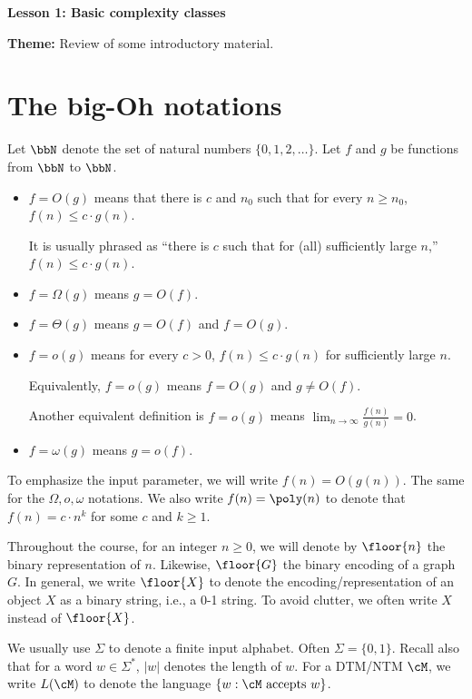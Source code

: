 \documentclass[11pt, a4paper]{article}
\renewcommand{\lesson}{1}
\renewcommand{\lessontitle}{Basic complexity classes}
\renewcommand{\fulltitle}{Lesson \lesson: \lessontitle}
\begin{document}
\date{}



\begin{center}
{\Large {\bf \fulltitle}}
\end{center}
\vspace{0.5cm}

\noindent
{\bf Theme:} Review of some introductory material.

\section{The big-Oh notations}

Let $\bbN$ denote the set of natural numbers $\{0,1,2,\ldots\}$.
Let $f$ and $g$ be functions from $\bbN$ to $\bbN$.
\begin{itemize}
\item
$f= O(g)$ means that there is $c$ and $n_0$
such that for every $n\geq n_0$, $f(n) \leq  c\cdot g(n)$.

It is usually phrased as ``there is $c$
such that for (all) sufficiently large $n$,'' $f(n)\leq c\cdot g(n)$.

\item
$f= \Omega(g)$ means $g=O(f)$.
\item
$f= \Theta(g)$ means $g=O(f)$ and $f=O(g)$.
\item
$f=o(g)$ means for every $c > 0$, $f(n)\leq c\cdot g(n)$ for sufficiently large $n$.

Equivalently, $f=o(g)$ means $f=O(g)$ and $g\neq O(f)$. 

Another equivalent definition is  $f=o(g)$ means $\lim_{n\to \infty} \frac{f(n)}{g(n)}=0$.

\item
$f=\omega(g)$ means $g=o(f)$.
\end{itemize}
To emphasize the input parameter, we will write $f(n)=O(g(n))$. 
The same for the $\Omega, o, \omega$ notations.
We also write $f(n)=\poly(n)$ to denote that $f(n)=c\cdot n^k$ for some $c$ and $k\geq 1$.


Throughout the course, for an integer $n\geq 0$,
we will denote by $\floor {n}$ the binary representation of $n$.
Likewise, $\floor{G}$ the binary encoding of a graph $G$.
In general, we write $\floor{X}$ to denote the encoding/representation of an object $X$
as a binary string, i.e., a 0-1 string.
To avoid clutter, we often write $X$ instead of $\floor {X}$.

We usually use $\Sigma$ to denote a finite input alphabet. Often $\Sigma=\{0,1\}$.
Recall also that for a word $w\in \Sigma^*$, $|w|$ denotes the length of $w$.
For a DTM/NTM $\cM$, we write $L(\cM)$ to denote the language $\{w : \cM \ \text{accepts}\ w \}$.
\end{document}

